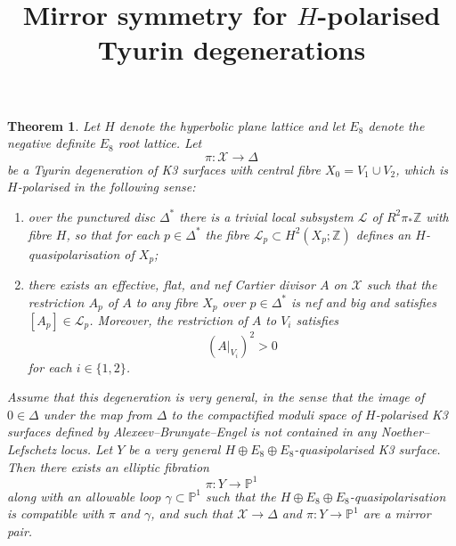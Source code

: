 \documentclass[11pt]{amsart}
\title{Mirror symmetry for \(H\)-polarised Tyurin degenerations}
\author{}
\date{}
\newtheorem{theorem}{Theorem}
\newcommand{\bP}{\mathbb{P}}
\newcommand{\bZ}{\mathbb{Z}}
\newcommand{\bD}{\Delta}
\newcommand{\cX}{\mathcal{X}}
\newcommand{\cL}{\mathcal{L}}
\begin{document}
\maketitle

\begin{theorem}\label{thm:main}
Let \(H\) denote the hyperbolic plane lattice and let \(E_8\) denote the negative definite \(E_8\) root lattice. Let
\[
\pi\colon \cX \to \bD
\]
be a Tyurin degeneration of K3 surfaces with central fibre \(X_0=V_1\cup V_2\), which is \(H\)-polarised in the following sense:
\begin{enumerate}
\item over the punctured disc \(\bD^*\) there is a trivial local subsystem \(\cL\) of \(R^2\pi_*\bZ\) with fibre \(H\), so that for each \(p\in \bD^*\) the fibre \(\cL_p\subset H^2(X_p;\bZ)\) defines an \(H\)-quasipolarisation of \(X_p\);
\item there exists an effective, flat, and nef Cartier divisor \(A\) on \(\cX\) such that the restriction \(A_p\) of \(A\) to any fibre \(X_p\) over \(p\in \bD^*\) is nef and big and satisfies \([A_p]\in \cL_p\). Moreover, the restriction of \(A\) to \(V_i\) satisfies
\[
(A|_{V_i})^2>0
\]
for each \(i\in\{1,2\}\).
\end{enumerate}
Assume that this degeneration is very general, in the sense that the image of \(0\in \bD\) under the map from \(\bD\) to the compactified moduli space of \(H\)-polarised K3 surfaces defined by Alexeev--Brunyate--Engel is not contained in any Noether--Lefschetz locus. Let \(Y\) be a very general \(H\oplus E_8\oplus E_8\)-quasipolarised K3 surface. Then there exists an elliptic fibration
\[
\pi\colon Y\to \bP^1
\]
along with an allowable loop \(\gamma\subset \bP^1\) such that the \(H\oplus E_8\oplus E_8\)-quasipolarisation is compatible with \(\pi\) and \(\gamma\), and such that \(\cX\to \bD\) and \(\pi\colon Y\to \bP^1\) are a mirror pair.
\end{theorem}
\end{document}
